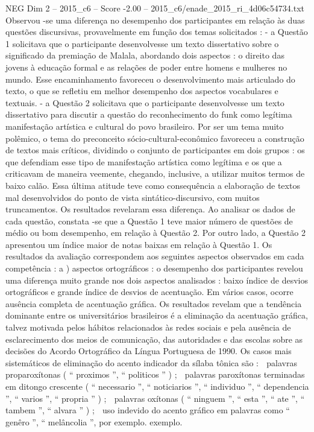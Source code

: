 \begin{textsample}{NEG Dim 2 – 2015\_c6 – Score -2.00 – 2015\_c6/enade\_2015\_ri\_4d06c54734.txt}
Observou -se uma diferença no desempenho dos participantes em relação às duas questões discursivas, provavelmente em função dos temas solicitados : - a Questão 1 solicitava que o participante desenvolvesse um texto dissertativo sobre o significado da premiação de Malala, abordando dois aspectos : o direito das jovens à educação formal e as relações de poder entre homens e mulheres no mundo.
Esse encaminhamento favoreceu o desenvolvimento mais articulado do texto, o que se refletiu em melhor desempenho dos aspectos vocabulares e textuais. - a Questão 2 solicitava que o participante desenvolvesse um texto dissertativo para discutir a questão do reconhecimento do funk como legítima manifestação artística e cultural do povo brasileiro.
Por ser um tema muito polêmico, o tema do preconceito sócio-cultural-econômico favoreceu a construção de textos mais críticos, dividindo o conjunto de participantes em dois grupos : os que defendiam esse tipo de manifestação artística como legítima e os que a criticavam de maneira veemente, chegando, inclusive, a utilizar muitos termos de baixo calão.
Essa última atitude teve como consequência a elaboração de textos mal desenvolvidos do ponto de vista sintático-discursivo, com muitos truncamentos.
Os resultados revelaram essa diferença.
Ao analisar os dados de cada questão, constata -se que a Questão 1 teve maior número de questões de médio ou bom desempenho, em relação à Questão 2.
Por outro lado, a Questão 2 apresentou um índice maior de notas baixas em relação à Questão 1.
Os resultados da avaliação correspondem aos seguintes aspectos observados em cada competência : a ) aspectos ortográficos : o desempenho dos participantes revelou uma diferença muito grande nos dois aspectos analisados : baixo índice de desvios ortográficos e grande índice de desvios de acentuação.
Em vários casos, ocorre ausência completa de acentuação gráfica.
Os resultados revelam que a tendência dominante entre os universitários brasileiros é a eliminação da acentuação gráfica, talvez motivada pelos hábitos relacionados às redes sociais e pela ausência de esclarecimento dos meios de comunicação, das autoridades e das escolas sobre as decisões do Acordo Ortográfico da Língua Portuguesa de 1990.
Os casos mais sistemáticos de eliminação do acento indicador da sílaba tônica são :  palavras proparoxítonas ( “ proximos ”, “ politicos ” ) ;  palavras paroxítonas terminadas em ditongo crescente ( “ necessario ”, “ noticiarios ”, “ individuo ”, “ dependencia ”, “ varios ”, “ propria ” ) ;  palavras oxítonas ( “ ninguem ”, “ esta ”, “ ate ”, “ tambem ”, “ alvara ” ) ;  uso indevido do acento gráfico em palavras como “ genêro ”, “ melâncolia ”, por exemplo. exemplo.

\end{textsample}
